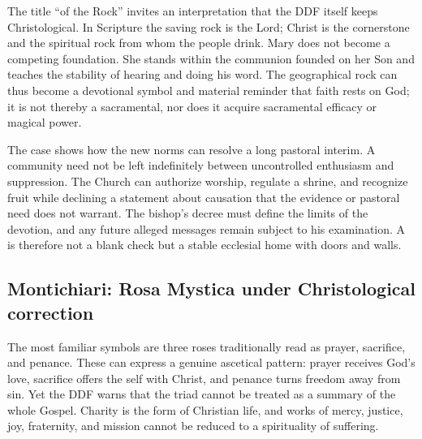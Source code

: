 The title ``of the Rock'' invites an interpretation that the DDF itself keeps Christological. In Scripture the saving rock is the Lord; Christ is the cornerstone and the spiritual rock from whom the people drink. Mary does not become a competing foundation. She stands within the communion founded on her Son and teaches the stability of hearing and doing his word. The geographical rock can thus become a devotional symbol and material reminder that faith rests on God; it is not thereby a sacramental, nor does it acquire sacramental efficacy or magical power.

The case shows how the new norms can resolve a long pastoral interim. A community need not be left indefinitely between uncontrolled enthusiasm and suppression. The Church can authorize worship, regulate a shrine, and recognize fruit while declining a statement about causation that the evidence or pastoral need does not warrant. The bishop's decree must define the limits of the devotion, and any future alleged messages remain subject to his examination. A  is therefore not a blank check but a stable ecclesial home with doors and walls.

\subsection{Montichiari: Rosa Mystica under Christological correction}


The most familiar symbols are three roses traditionally read as prayer, sacrifice, and penance. These can express a genuine ascetical pattern: prayer receives God's love, sacrifice offers the self with Christ, and penance turns freedom away from sin. Yet the DDF warns that the triad cannot be treated as a summary of the whole Gospel. Charity is the form of Christian life, and works of mercy, justice, joy, fraternity, and mission cannot be reduced to a spirituality of suffering.

